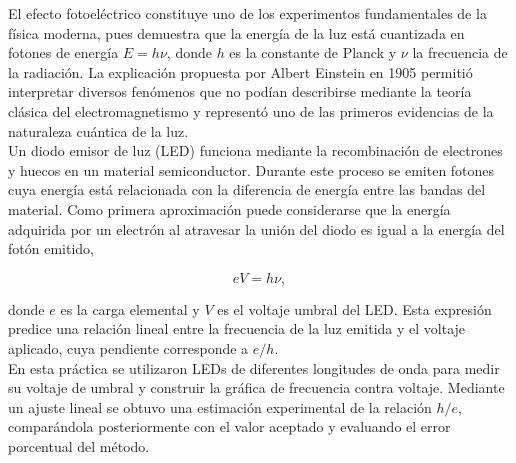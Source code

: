 El efecto fotoeléctrico constituye uno de los experimentos fundamentales de la
física moderna, pues demuestra que la energía de la luz está cuantizada en
fotones de energía $E=h\nu$, donde $h$ es la constante de Planck y $\nu$ la
frecuencia de la radiación. La explicación propuesta por Albert Einstein en
1905 permitió interpretar diversos fenómenos que no podían describirse mediante
la teoría clásica del electromagnetismo y representó uno de las primeros
evidencias de la naturaleza cuántica de la luz. \\

Un diodo emisor de luz (LED) funciona mediante la recombinación de electrones y
huecos en un material semiconductor. Durante este proceso se emiten fotones cuya
energía está relacionada con la diferencia de energía entre las bandas del
material. Como primera aproximación puede considerarse que la energía adquirida
por un electrón al atravesar la unión del diodo es igual a la energía del fotón
emitido,

\[
eV=h\nu,
\]

donde $e$ es la carga elemental y $V$ es el voltaje umbral del LED. Esta
expresión predice una relación lineal entre la frecuencia de la luz emitida y el
voltaje aplicado, cuya pendiente corresponde a $e/h$.\\

En esta práctica se utilizaron LEDs de diferentes longitudes de onda para medir
su voltaje de umbral y construir la gráfica de frecuencia contra voltaje.
Mediante un ajuste lineal se obtuvo una estimación experimental de la relación
$h/e$, comparándola posteriormente con el valor aceptado y evaluando el error
porcentual del método.